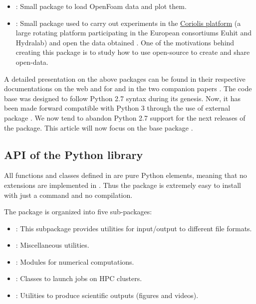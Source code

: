 \begin{itemize}
\item {}: Small package to load OpenFoam data and plot them.

\item {}: Small package used to carry out experiments in the
\href{http://www.legi.grenoble-inp.fr/web/spip.php?article757}{Coriolis platform}
(a large rotating platform participating in the European consortiums Euhit and
Hydralab) and open the data obtained \cite[see, for example,][]{ISSF2016}. One of
the motivations behind creating this package is to study how to use open-source to
create and share open-data.

\end{itemize}

A detailed presentation on the above packages can be found in their respective
documentations on the web and for  and  in the
two companion papers \cite[]{fluidfft, fluidsim}.
%
The code base was designed to follow Python 2.7 syntax during its genesis. Now,
it has been made forward compatible with Python 3 through the use of external
package .
%
We now tend to abandon Python 2.7 support for the next releases of the package.
%
This article will now focus on the base package \fluiddyn.

\subsection*{API of the Python library \fluiddyn}

All functions and classes defined in \fluiddyn are pure Python elements, meaning
that no extensions are implemented in \fluiddyn.  Thus the package \fluiddyn is
extremely easy to install with just a  command and no
compilation.

The package \fluiddyn is organized into five sub-packages:
\begin{itemize}
\item {}: This subpackage provides utilities for
input/output to different file formats.
\item {}: Miscellaneous utilities.
\item {}: Modules for numerical computations.
\item {}: Classes to launch jobs on HPC clusters.
\item {}: Utilities to produce scientific outputs
(figures and videos).
\end{itemize}

